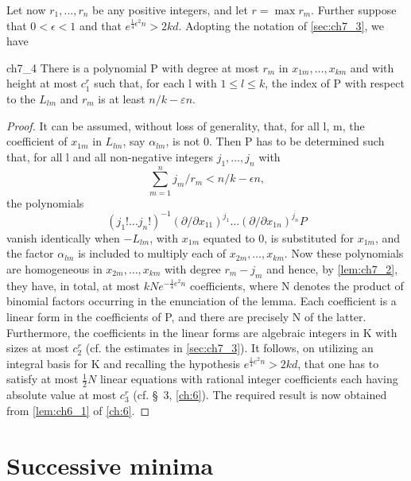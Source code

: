 Let now  $r_1, ..., r_n$  be any positive integers, and let  $r = \max r_m$. Further suppose that  $0 < \epsilon < 1$  and that  $e^{\frac{1}{4}\epsilon^2n} > 2kd$. Adopting the notation of \autoref{sec:ch7_3}, we have

\begin{mylemma}{}{ch7_4}
There is a polynomial P with degree at most  $r_m$  in  $x_{1m}, \ldots, x_{km}$  and with height at most  $c_1^r$  such that, for each l with  $1 \le l \le k$, the index of P with respect to the  $L_{lm}$  and  $r_m$  is at least  $n/k - \varepsilon n$.
\end{mylemma}

\begin{proof}
It can be assumed, without loss of generality, that, for all l, m, the coefficient of  $x_{1m}$  in  $L_{lm}$, say  $\alpha_{lm}$, is not 0. Then P has to be determined such that, for all l and all non-negative integers  $j_1, \ldots, j_n$  with
\[\sum_{m=1}^{n} j_m/r_m < n/k - \epsilon n,\]
the polynomials
\[(j_1! \dots j_n!)^{-1} (\partial/\partial x_{11})^{j_1} \dots (\partial/\partial x_{1n})^{j_n} P\]
vanish identically when  $-L_{lm}$, with  $x_{1m}$  equated to 0, is substituted for  $x_{1m}$, and the factor  $\alpha_{lm}$  is included to multiply each of  $x_{2m}, \ldots, x_{km}$. Now these polynomials are homogeneous in  $x_{2m}, \ldots, x_{km}$  with degree  $r_m - j_m$  and hence, by \autoref{lem:ch7_2}, they have, in total, at most  $kNe^{-\frac{1}{4}e^2n}$  coefficients, where N denotes the product of binomial factors occurring in the enunciation of the lemma. Each coefficient is a linear form in the coefficients of P, and there are precisely N of the latter. Furthermore, the coefficients in the linear forms are algebraic integers in K with sizes at most  $c_2^r$  (cf. the estimates in \autoref{sec:ch7_3}). It follows, on utilizing an integral basis for K and recalling the hypothesis  $e^{\frac{1}{4}e^2n} > 2kd$, that one has to satisfy at most  $\frac{1}{2}N$  linear equations with rational integer coefficients each having absolute value at most  $c_3^r$  (cf. \S~3, \autoref{ch:6}). The required result is now obtained from \autoref{lem:ch6_1} of \autoref{ch:6}.
\end{proof}

\section{Successive minima}\label{sec:ch7_7}

